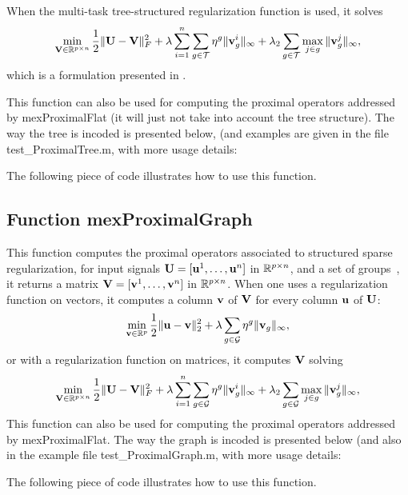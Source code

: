 \documentclass[a4paper, 11pt]{article}
\begin{document}
   When the multi-task tree-structured regularization function is used, it solves
   \begin{equation}
   \min_{{\mathbf V} \in {\mathbb R}^{p\times n}} \frac{1}{2}\|{\mathbf U}-{\mathbf V}\|_F^2 + \lambda \sum_{i=1}^n\sum_{g \in {\mathcal T}} \eta^g \|{\mathbf v}^i_g\|_\infty + \lambda_2\sum_{g \in {\mathcal T}} \max_{j \in g} \|{\mathbf v}^j_g\|_\infty,
   \end{equation} 
   which is a formulation presented in \cite{mairal10}.

   This function can also be used for computing the proximal operators addressed by mexProximalFlat (it will just not take into account the tree structure). The way the tree is incoded is presented below, (and examples are given in the file test\_ProximalTree.m, with more usage details:

The following piece of code illustrates how to use this function.


%          

\subsection{Function mexProximalGraph}
This function computes the proximal operators associated to structured sparse regularization, for input signals ${\mathbf U}=[{\mathbf u}^1,\ldots,{\mathbf u}^n]$ in ${\mathbb R}^{p \times n}$, and a set of groups~\cite{mairal10}, it returns a matrix ${\mathbf V}=[{\mathbf v}^1,\ldots,{\mathbf v}^n]$ in ${\mathbb R}^{p \times n}$.
When one uses a regularization function on vectors, it computes a column ${\mathbf v}$ of ${\mathbf V}$ for every column ${\mathbf u}$ of ${\mathbf U}$:
\begin{equation}
\min_{{\mathbf v} \in {\mathbb R}^p} \frac{1}{2}\|{\mathbf u}-{\mathbf v}\|_2^2 + \lambda \sum_{g \in {\mathcal G}} \eta^g \|{\mathbf v}_g\|_\infty,
\end{equation}
or with a regularization function on matrices, it computes ${\mathbf V}$ solving
\begin{equation}
\min_{{\mathbf V} \in {\mathbb R}^{p\times n}} \frac{1}{2}\|{\mathbf U}-{\mathbf V}\|_F^2 + \lambda \sum_{i=1}^n\sum_{g \in {\mathcal G}} \eta^g \|{\mathbf v}^i_g\|_\infty + \lambda_2\sum_{g \in {\mathcal G}} \max_{j \in g} \|{\mathbf v}^j_g\|_\infty,
\end{equation} 
This function can also be used for computing the proximal operators addressed by mexProximalFlat. The way the graph is incoded is presented below (and also in the example file test\_ProximalGraph.m, with more usage details:

The following piece of code illustrates how to use this function.

\end{document}
